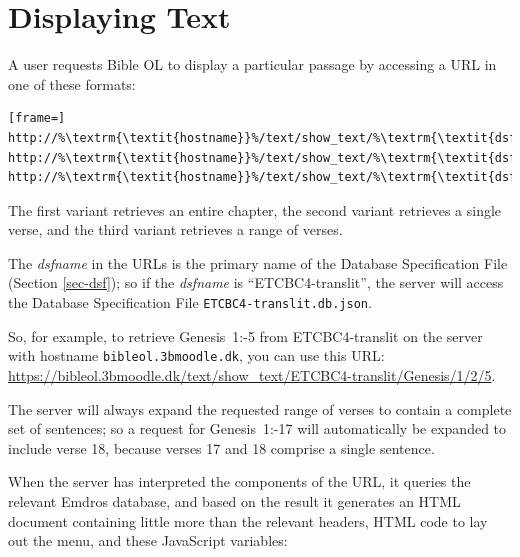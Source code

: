 \documentclass[11pt,oneside,a4paper]{memoir}
\newcommand*{\bibleref}[3]{#1~#2\thinspace:\thinspace#3}
\begin{document}
\section{Displaying Text}\label{displaying-text}

A user requests Bible OL to display a particular passage by accessing a URL%
in one of these formats:

\begin{lstlisting}[frame=]
http://%\textrm{\textit{hostname}}%/text/show_text/%\textrm{\textit{dsfname}}%/%\textrm{\textit{book}}%/%\textrm{\textit{chapter}}%
http://%\textrm{\textit{hostname}}%/text/show_text/%\textrm{\textit{dsfname}}%/%\textrm{\textit{book}}%/%\textrm{\textit{chapter}}%/%\textrm{\textit{verse}}%
http://%\textrm{\textit{hostname}}%/text/show_text/%\textrm{\textit{dsfname}}%/%\textrm{\textit{book}}%/%\textrm{\textit{chapter}}%/%\textrm{\textit{firstverse}}%/%\textrm{\textit{lastverse}}%
\end{lstlisting}

The first variant retrieves an entire chapter, the second variant retrieves a single verse, and the
third variant retrieves a range of verses.

The \emph{dsfname} in the URLs is the primary name of the Database Specification File%
(Section \ref{sec-dsf}); so if the \emph{dsfname} is ``ETCBC4-translit'', the
server will access the Database Specification File \texttt{ETCBC4-translit.db.json}.

So, for example, to retrieve \bibleref{Genesis}{1}{2-5} from ETCBC4-translit on the
server with hostname \texttt{bibleol.3bmoodle.dk}, you can use this URL:
\url{https://bibleol.3bmoodle.dk/text/show_text/ETCBC4-translit/Genesis/1/2/5}.

The server will always expand the requested range of verses to contain a complete set of sentences;
so a request for \bibleref{Genesis}{1}{16-17} will automatically be expanded to include verse 18,
because verses 17 and 18 comprise a single sentence.

When the server has interpreted the components of the URL, it queries the relevant Emdros database,
and based on the result it generates an HTML document containing little more than the relevant
headers, HTML code to lay out the menu, and these JavaScript variables:
\end{document}
